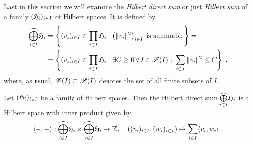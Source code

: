 \para
Last in this section we will examine the \emph{Hilbert direct sum} or just \emph{Hilbert sum} of a family
$(\mathfrak{H}_i)_{i\in I}$ of Hilbert spaces. It is defined by
\begin{equation*}
  \begin{split}
   \widehat{\bigoplus\limits_{i\in I}} \mathfrak{H}_i & = \left\{ (v_i)_{i\in I} \in \prod_{i\in I}\mathfrak{H}_i
   \Bigm\vert \left( \|v_i\|^2 \right)_{i\in I} \text{ is summable} \right\} = \\
   & = \left\{ (v_i)_{i\in I} \in \prod_{i\in I}\mathfrak{H}_i
   \Bigm\vert \exists C \geq 0 \, \forall J \in \mathscr{F} (I): \: \sum_{i\in J} \|v_i\|^2 \leq C \right\} \ ,
  \end{split}
\end{equation*}
where, as usual, $\mathscr{F} (I)\subset \mathscr{P}(I)$ denotes the set of all finite subsets of $I$.

\begin{proposition}
  Let $(\mathfrak{H}_i)_{i\in I}$ be a family of Hilbert spaces. Then the Hilbert direct sum
  $\widehat{\bigoplus\limits_{i\in I}} \mathfrak{H}_i$ is a Hilbert space with inner product  given by
  \[
    \langle -,- \rangle : \widehat{\bigoplus\limits_{i\in I}} \mathfrak{H}_i \times
    \widehat{\bigoplus\limits_{i\in I}} \mathfrak{H}_i \to \mathbb{K}, \quad
    \left( (v_i)_{i\in I} ,  (w_i)_{i\in I} \right) \mapsto \sum_{i\in I} \langle v_i,w_i \rangle \ .
  \]
\end{proposition}

